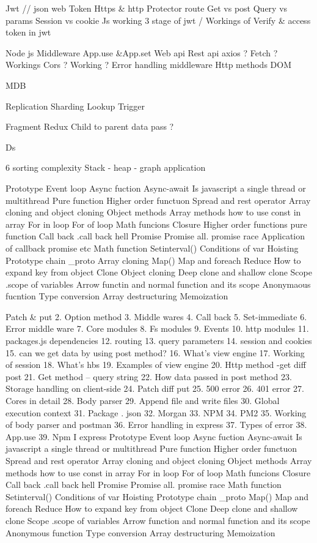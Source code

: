 
Jwt  // json web Token 
Https & http
Protector route
Get vs post
Query vs params
Session vs cookie
Js working
3 stage of jwt /
Workings of Verify & access token in jwt 


Node js
Middleware
App.use &App.set
Web api
Rest api
axios ? Fetch ? Workings
Cors ? Working ?
Error handling middleware
Http methods
DOM 

MDB

Replication
Sharding
Lookup
Trigger



Fragment
Redux
Child to parent data pass ?


Ds 

6 sorting complexity 
Stack - heap - graph application

Prototype
Event loop
Async fuction
Async-await
Is javascript a single thread or multithread
Pure function
Higher order functuon
Spread and rest operator
Array cloning  and object cloning
Object methods
Array methods
 how to use const in array
For in loop
For of loop
Math funcions
Closure
Higher order functions pure function
Call back
.call back hell
Promise
Promise all.
promise race
Application of callback promise etc
Math function
Setinterval()
Conditions of var
Hoisting
Prototype chain
_proto
Array cloning
Map()
Map and foreach
Reduce
How to expand key from object
Clone
Object cloning
Deep clone and shallow clone
Scope
.scope of variables
Arrow functin and normal function and its scope
Anonymaous fucntion
Type conversion
Array destructuring
Memoization

Patch & put 
2.	Option method 
3.	Middle wares
4.	Call back
5.	 Set-immediate
6.	Error middle ware 
7.	Core modules 
8.	Fs modules 
9.	Events
10.	http modules
11.	packages.js dependencies
12.	routing
13.	query parameters
14.	session and cookies
15.	can we get data by using post method?
16.	What’s view engine
17.	Working of session
18.	What’s hbs
19.	Examples of view engine
20.	Http method -get diff post 
21.	Get method – query string
22.	How data passed in post method
23.	Storage handling on client-side
24.	Patch diff put 
25.	500 error
26.	401 error
27.	Cores in detail
28.	Body parser
29.	Append file and write files
30.	Global execution context
31.	Package . json
32.	Morgan
33.	NPM 
34.	PM2 
35.	Working of body parser and postman
36.	Error handling in express
37.	Types of error 
38.	App.use
39.	Npm I express
Prototype
Event loop
Async fuction
Async-await
Is javascript a single thread or multithread
Pure function
Higher order functuon
Spread and rest operator
Array cloning  and object cloning
Object methods
Array methods
 how to use const in array
For in loop
For of loop
Math funcions
Closure
Call back
.call back hell
Promise
Promise all.
promise race
Math function
Setinterval()
Conditions of var
Hoisting
Prototype chain
_proto
Map()
Map and foreach
Reduce
How to expand key from object
Clone
Deep clone and shallow clone
Scope
.scope of variables
Arrow function and normal function and its scope
Anonymous function 
Type conversion
Array destructuring
Memoization

